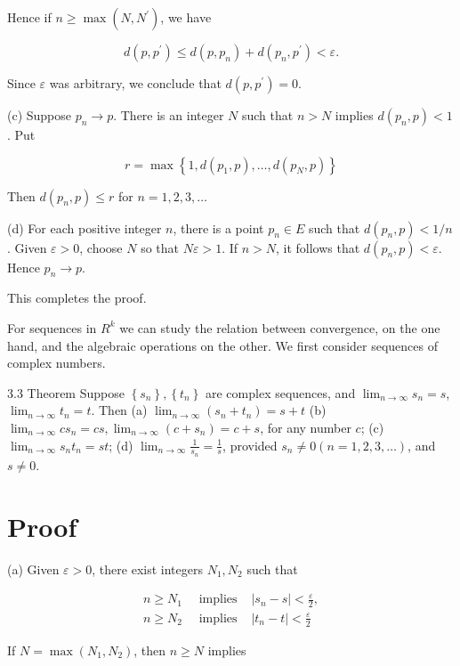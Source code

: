 \documentclass[10pt]{article}
\begin{document}
Hence if $n \geq \max \left(N, N^{\prime}\right)$, we have

$$
d\left(p, p^{\prime}\right) \leq d\left(p, p_{n}\right)+d\left(p_{n}, p^{\prime}\right)<\varepsilon .
$$

Since $\varepsilon$ was arbitrary, we conclude that $d\left(p, p^{\prime}\right)=0$.

(c) Suppose $p_{n} \rightarrow p$. There is an integer $N$ such that $n>N$ implies $d\left(p_{n}, p\right)<1$. Put

$$
r=\max \left\{1, d\left(p_{1}, p\right), \ldots, d\left(p_{N}, p\right)\right\}
$$

Then $d\left(p_{n}, p\right) \leq r$ for $n=1,2,3, \ldots$

(d) For each positive integer $n$, there is a point $p_{n} \in E$ such that $d\left(p_{n}, p\right)<1 / n$. Given $\varepsilon>0$, choose $N$ so that $N \varepsilon>1$. If $n>N$, it follows that $d\left(p_{n}, p\right)<\varepsilon$. Hence $p_{n} \rightarrow p$.

This completes the proof.

For sequences in $R^{k}$ we can study the relation between convergence, on the one hand, and the algebraic operations on the other. We first consider sequences of complex numbers.

3.3 Theorem Suppose $\left\{s_{n}\right\},\left\{t_{n}\right\}$ are complex sequences, and $\lim _{n \rightarrow \infty} s_{n}=s$, $\lim _{n \rightarrow \infty} t_{n}=t$. Then
(a) $\lim _{n \rightarrow \infty}\left(s_{n}+t_{n}\right)=s+t$
(b) $\lim _{n \rightarrow \infty} c s_{n}=c s, \lim _{n \rightarrow \infty}\left(c+s_{n}\right)=c+s$, for any number $c$;
(c) $\lim _{n \rightarrow \infty} s_{n} t_{n}=s t$;
(d) $\lim _{n \rightarrow \infty} \frac{1}{s_{n}}=\frac{1}{s}$, provided $s_{n} \neq 0(n=1,2,3, \ldots)$, and $s \neq 0$.

\section{Proof}
(a) Given $\varepsilon>0$, there exist integers $N_{1}, N_{2}$ such that

$$
\begin{array}{ll}
n \geq N_{1} \quad \text { implies } & \left|s_{n}-s\right|<\frac{\varepsilon}{2}, \\
n \geq N_{2} \quad \text { implies } & \left|t_{n}-t\right|<\frac{\varepsilon}{2}
\end{array}
$$

If $N=\max \left(N_{1}, N_{2}\right)$, then $n \geq N$ implies
\end{document}
